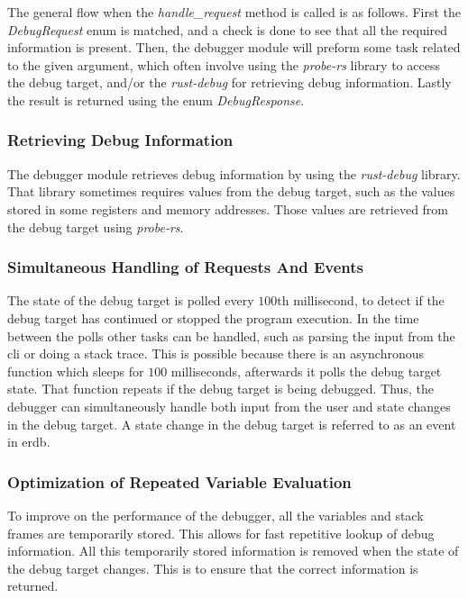 The general flow when the \emph{handle\_request} method is called is as follows.
First the \emph{DebugRequest} enum is matched, and a check is done to see that all the required information is present.
Then, the debugger module will preform some task related to the given argument, which often involve using the \emph{probe-rs} library to access the debug target, and/or the \emph{rust-debug} for retrieving debug information.
Lastly the result is returned using the enum \emph{DebugResponse}.



\subsubsection{Retrieving Debug Information}
The debugger module retrieves debug information by using the \emph{rust-debug} library.
That library sometimes requires values from the debug target, such as the values stored in some registers and memory addresses.
Those values are retrieved from the debug target using \emph{probe-rs}.



\subsubsection{Simultaneous Handling of Requests And Events}
The state of the debug target is polled every $100\text{th}$ millisecond, to detect if the debug target has continued or stopped the program execution.
In the time between the polls other tasks can be handled, such as parsing the input from the \acrshort{cli} or doing a stack trace.
This is possible because there is an asynchronous function which sleeps for $100$ milliseconds, afterwards it polls the debug target state.
That function repeats if the debug target is being debugged.
Thus, the debugger can simultaneously handle both input from the user and state changes in the debug target.
A state change in the debug target is referred to as an event in \gls{erdb}.



\subsubsection{Optimization of Repeated Variable Evaluation}
To improve on the performance of the debugger, all the variables and stack frames are temporarily stored.
This allows for fast repetitive lookup of debug information.
All this temporarily stored information is removed when the state of the debug target changes.
This is to ensure that the correct information is returned.


